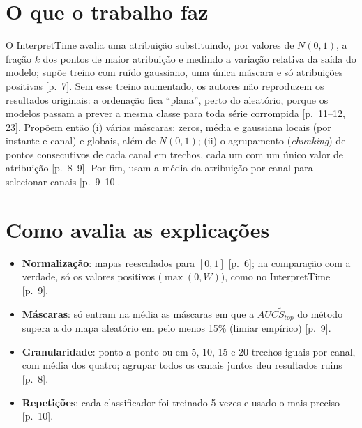 \documentclass[11pt,a4paper]{article}
\begin{document}
\section{O que o trabalho faz}
O InterpretTime avalia uma atribuição substituindo, por valores de $N(0,1)$, a fração $k$ dos pontos de maior atribuição e medindo a variação relativa da saída do modelo; supõe treino com ruído gaussiano, uma única máscara e só atribuições positivas [p.~7]. Sem esse treino aumentado, os autores não reproduzem os resultados originais: a ordenação fica ``plana'', perto do aleatório, porque os modelos passam a prever a mesma classe para toda série corrompida [p.~11--12, 23]. Propõem então (i) várias máscaras: zeros, média e gaussiana locais (por instante e canal) e globais, além de $N(0,1)$; (ii) o agrupamento (\textit{chunking}) de pontos consecutivos de cada canal em trechos, cada um com um único valor de atribuição [p.~8--9]. Por fim, usam a média da atribuição por canal para selecionar canais [p.~9--10].

\section{Como avalia as explicações}
\begin{itemize}
\item \textbf{Normalização}: mapas reescalados para $[0,1]$ [p.~6]; na comparação com a verdade, só os valores positivos ($\max(0,W)$), como no InterpretTime [p.~9].
\item \textbf{Máscaras}: só entram na média as máscaras em que a $AUC\tilde{S}_{top}$ do método supera a do mapa aleatório em pelo menos 15\% (limiar empírico) [p.~9].
\item \textbf{Granularidade}: ponto a ponto ou em 5, 10, 15 e 20 trechos iguais por canal, com média dos quatro; agrupar todos os canais juntos deu resultados ruins [p.~8].
\item \textbf{Repetições}: cada classificador foi treinado 5 vezes e usado o mais preciso [p.~10].
\end{itemize}
\end{document}
